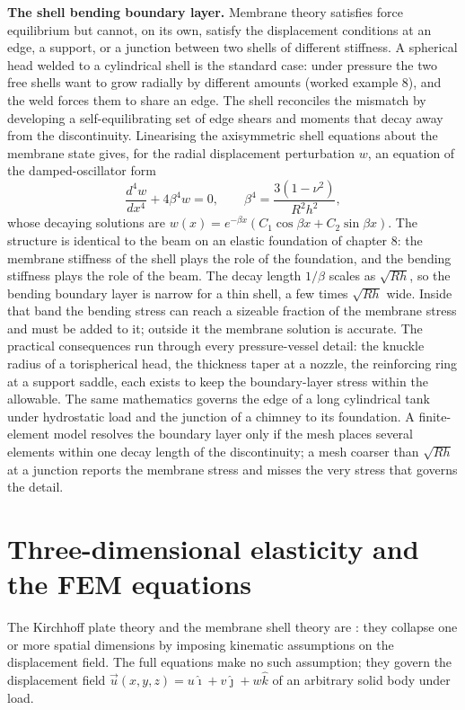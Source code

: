 \begin{mastery}
\textbf{The shell bending boundary layer.} Membrane theory satisfies
force equilibrium but cannot, on its own, satisfy the displacement
conditions at an edge, a support, or a junction between two shells of
different stiffness. A spherical head welded to a cylindrical shell is
the standard case: under pressure the two free shells want to grow
radially by different amounts (worked example 8), and the weld forces
them to share an edge. The shell reconciles the mismatch by developing
a self-equilibrating set of edge shears and moments that decay away
from the discontinuity. Linearising the axisymmetric shell equations
about the membrane state gives, for the radial displacement
perturbation $w$, an equation of the damped-oscillator form
\[
\frac{d^4 w}{dx^4} + 4\beta^4 w = 0, \qquad
\beta^4 = \frac{3(1-\nu^2)}{R^2 h^2},
\]
whose decaying solutions are $w(x) = e^{-\beta x}(C_1\cos\beta x +
C_2\sin\beta x)$. The structure is identical to the beam on an elastic
foundation of chapter 8: the membrane stiffness of the shell plays the
role of the foundation, and the bending stiffness plays the role of the
beam. The decay length $1/\beta$ scales as $\sqrt{R h}$, so the bending
boundary layer is narrow for a thin shell, a few times $\sqrt{Rh}$
wide. Inside that band the bending stress can reach a sizeable fraction
of the membrane stress and must be added to it; outside it the membrane
solution is accurate. The practical consequences run through every
pressure-vessel detail: the knuckle radius of a torispherical head, the
thickness taper at a nozzle, the reinforcing ring at a support saddle,
each exists to keep the boundary-layer stress within the allowable. The
same mathematics governs the edge of a long cylindrical tank under
hydrostatic load and the junction of a chimney to its foundation. A
finite-element model resolves the boundary layer only if the mesh
places several elements within one decay length of the discontinuity;
a mesh coarser than $\sqrt{Rh}$ at a junction reports the membrane
stress and misses the very stress that governs the detail.
\end{mastery}

\section{Three-dimensional elasticity and the FEM equations}

The Kirchhoff plate theory and the membrane shell theory are
: they collapse one or more spatial
dimensions by imposing kinematic assumptions on the displacement
field. The full 
equations make no such assumption; they govern the displacement
field $\vec{u}(x, y, z) = u\hat{\imath} + v\hat{\jmath} + w\hat{k}$
of an arbitrary solid body under load.

